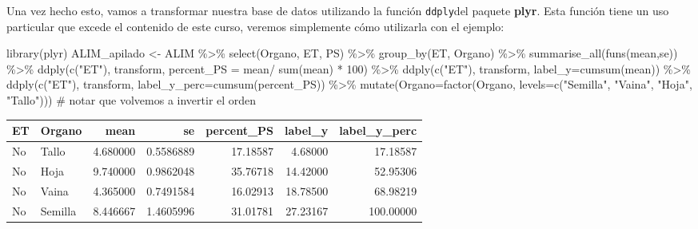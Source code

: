 \documentclass[
  letterpaper,
  DIV=11,
  numbers=noendperiod]{scrartcl}
\newenvironment{Shaded}{\begin{snugshade}}{\end{snugshade}}
\newcommand{\AttributeTok}[1]{\textcolor[rgb]{0.40,0.45,0.13}{#1}}
\newcommand{\CommentTok}[1]{\textcolor[rgb]{0.37,0.37,0.37}{#1}}
\newcommand{\DecValTok}[1]{\textcolor[rgb]{0.68,0.00,0.00}{#1}}
\newcommand{\FunctionTok}[1]{\textcolor[rgb]{0.28,0.35,0.67}{#1}}
\newcommand{\NormalTok}[1]{\textcolor[rgb]{0.00,0.23,0.31}{#1}}
\newcommand{\OtherTok}[1]{\textcolor[rgb]{0.00,0.23,0.31}{#1}}
\newcommand{\SpecialCharTok}[1]{\textcolor[rgb]{0.37,0.37,0.37}{#1}}
\newcommand{\StringTok}[1]{\textcolor[rgb]{0.13,0.47,0.30}{#1}}
\begin{document}
Una vez hecho esto, vamos a transformar nuestra base de datos utilizando
la función \texttt{ddply}del paquete \textbf{plyr}. Esta función tiene
un uso particular que excede el contenido de este curso, veremos
simplemente cómo utilizarla con el ejemplo:

\begin{Shaded}
\begin{Highlighting}[]
\FunctionTok{library}\NormalTok{(plyr)}
\NormalTok{ALIM\_apilado }\OtherTok{\textless{}{-}}\NormalTok{ ALIM }\SpecialCharTok{\%\textgreater{}\%} \FunctionTok{select}\NormalTok{(Organo, ET, PS) }\SpecialCharTok{\%\textgreater{}\%} 
  \FunctionTok{group\_by}\NormalTok{(ET, Organo) }\SpecialCharTok{\%\textgreater{}\%} 
  \FunctionTok{summarise\_all}\NormalTok{(}\FunctionTok{funs}\NormalTok{(mean,se)) }\SpecialCharTok{\%\textgreater{}\%} 
  \FunctionTok{ddply}\NormalTok{(}\FunctionTok{c}\NormalTok{(}\StringTok{"ET"}\NormalTok{), transform,}
        \AttributeTok{percent\_PS =}\NormalTok{  mean}\SpecialCharTok{/} \FunctionTok{sum}\NormalTok{(mean) }\SpecialCharTok{*} \DecValTok{100}\NormalTok{) }\SpecialCharTok{\%\textgreater{}\%} 
  \FunctionTok{ddply}\NormalTok{(}\FunctionTok{c}\NormalTok{(}\StringTok{"ET"}\NormalTok{), transform, }\AttributeTok{label\_y=}\FunctionTok{cumsum}\NormalTok{(mean)) }\SpecialCharTok{\%\textgreater{}\%} 
  \FunctionTok{ddply}\NormalTok{(}\FunctionTok{c}\NormalTok{(}\StringTok{"ET"}\NormalTok{), transform, }\AttributeTok{label\_y\_perc=}\FunctionTok{cumsum}\NormalTok{(percent\_PS)) }\SpecialCharTok{\%\textgreater{}\%} 
  \FunctionTok{mutate}\NormalTok{(}\AttributeTok{Organo=}\FunctionTok{factor}\NormalTok{(Organo, }
                       \AttributeTok{levels=}\FunctionTok{c}\NormalTok{(}\StringTok{"Semilla"}\NormalTok{, }\StringTok{"Vaina"}\NormalTok{,}
                                             \StringTok{"Hoja"}\NormalTok{, }\StringTok{"Tallo"}\NormalTok{)))}
\CommentTok{\# notar que volvemos a invertir el orden  }
\end{Highlighting}
\end{Shaded}

\begin{longtable}[]{@{}llrrrrr@{}}
\toprule\noalign{}
ET & Organo & mean & se & percent\_PS & label\_y & label\_y\_perc \\
\midrule\noalign{}
\endhead
\bottomrule\noalign{}
\endlastfoot
No & Tallo & 4.680000 & 0.5586889 & 17.18587 & 4.68000 & 17.18587 \\
No & Hoja & 9.740000 & 0.9862048 & 35.76718 & 14.42000 & 52.95306 \\
No & Vaina & 4.365000 & 0.7491584 & 16.02913 & 18.78500 & 68.98219 \\
No & Semilla & 8.446667 & 1.4605996 & 31.01781 & 27.23167 & 100.00000 \\
\end{longtable}
\end{document}
